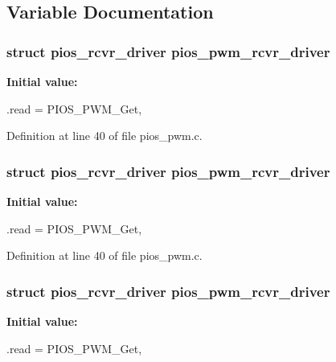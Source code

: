 \subsection{\-Variable \-Documentation}
\hypertarget{group___p_i_o_s___p_w_m_ga767a19a3a54afa71399b7467963690df}{
\subsubsection[{pios\-\_\-pwm\-\_\-rcvr\-\_\-driver}]{\setlength{\rightskip}{0pt plus 5cm}struct {\bf pios\-\_\-rcvr\-\_\-driver} {\bf pios\-\_\-pwm\-\_\-rcvr\-\_\-driver}}}\label{group___p_i_o_s___p_w_m_ga767a19a3a54afa71399b7467963690df}
{\bfseries \-Initial value\-:}
\begin{DoxyCode}
 {
        .read = PIOS_PWM_Get,
}
\end{DoxyCode}


\-Definition at line 40 of file pios\-\_\-pwm.\-c.

\hypertarget{group___p_i_o_s___p_w_m_ga767a19a3a54afa71399b7467963690df}{
\subsubsection[{pios\-\_\-pwm\-\_\-rcvr\-\_\-driver}]{\setlength{\rightskip}{0pt plus 5cm}struct {\bf pios\-\_\-rcvr\-\_\-driver} {\bf pios\-\_\-pwm\-\_\-rcvr\-\_\-driver}}}\label{group___p_i_o_s___p_w_m_ga767a19a3a54afa71399b7467963690df}
{\bfseries \-Initial value\-:}
\begin{DoxyCode}
 {
        .read = PIOS_PWM_Get,
}
\end{DoxyCode}


\-Definition at line 40 of file pios\-\_\-pwm.\-c.

\hypertarget{group___p_i_o_s___p_w_m_ga767a19a3a54afa71399b7467963690df}{
\subsubsection[{pios\-\_\-pwm\-\_\-rcvr\-\_\-driver}]{\setlength{\rightskip}{0pt plus 5cm}struct {\bf pios\-\_\-rcvr\-\_\-driver} {\bf pios\-\_\-pwm\-\_\-rcvr\-\_\-driver}}}\label{group___p_i_o_s___p_w_m_ga767a19a3a54afa71399b7467963690df}
{\bfseries \-Initial value\-:}
\begin{DoxyCode}
 {
        .read = PIOS_PWM_Get,
}
\end{DoxyCode}


